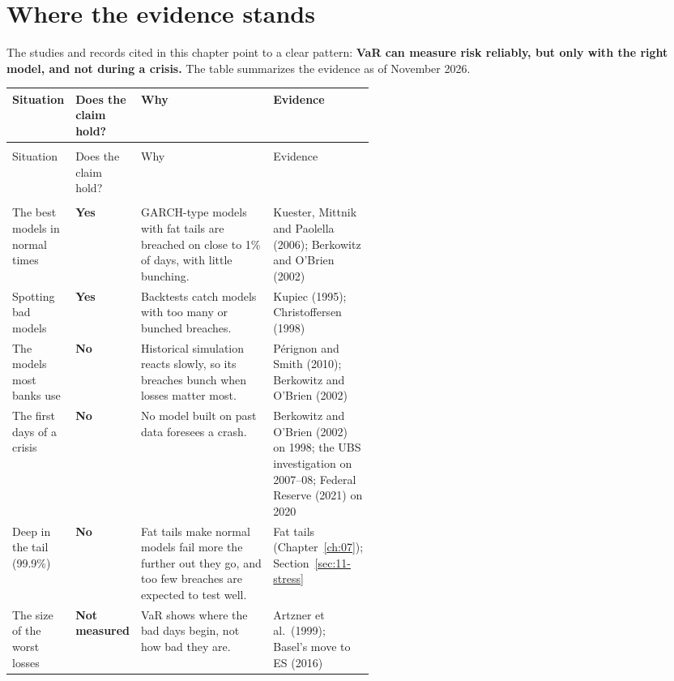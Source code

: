 \section{Where the evidence stands}
\label{sec:11-verdict}

The studies and records cited in this chapter point to a clear pattern: \textbf{VaR can measure risk reliably, but only with the right model, and not during a crisis.} The table summarizes the evidence as of November 2026.

\begingroup
\small
\setlength{\LTpre}{6pt}\setlength{\LTpost}{6pt}
\begin{longtable}{@{}>{\raggedright\arraybackslash}p{0.17\linewidth}>{\raggedright\arraybackslash}p{0.13\linewidth}>{\raggedright\arraybackslash}p{}>{\raggedright\arraybackslash}p{0.22\linewidth}@{}}
\toprule
Situation & Does the claim hold? & Why & Evidence \\
\midrule
\endfirsthead
\multicolumn{4}{@{}l}{\emph{(continued)}} \\
\toprule
Situation & Does the claim hold? & Why & Evidence \\
\midrule
\endhead
\midrule
\multicolumn{4}{r@{}}{\emph{(continued on the next page)}} \\
\endfoot
\bottomrule
\endlastfoot
The best models in normal times & \textbf{Yes} & GARCH-type models with fat tails are breached on close to 1\% of days, with little bunching. & Kuester, Mittnik and Paolella (2006); Berkowitz and O'Brien (2002) \\*
Spotting bad models & \textbf{Yes} & Backtests catch models with too many or bunched breaches. & Kupiec (1995); Christoffersen (1998) \\
The models most banks use & \textbf{No} & Historical simulation reacts slowly, so its breaches bunch when losses matter most. & P\'erignon and Smith (2010); Berkowitz and O'Brien (2002) \\
The first days of a crisis & \textbf{No} & No model built on past data foresees a crash. & Berkowitz and O'Brien (2002) on 1998; the UBS investigation on 2007--08; Federal Reserve (2021) on 2020 \\
Deep in the tail (99.9\%) & \textbf{No} & Fat tails make normal models fail more the further out they go, and too few breaches are expected to test well. & Fat tails (Chapter~\ref{ch:07}); Section~\ref{sec:11-stress} \\*
The size of the worst losses & \textbf{Not measured} & VaR\index{Value at Risk (VaR)!backtesting} shows where the bad days begin, not how bad they are. & Artzner et al.\ (1999); Basel's move to ES (2016) \\
\end{longtable}
\addtocounter{table}{-1}%
\endgroup

